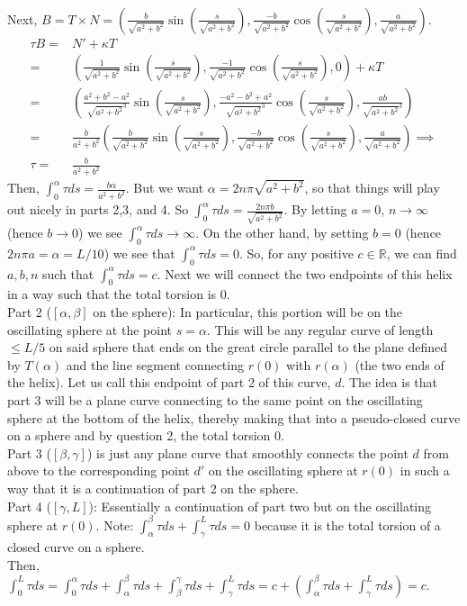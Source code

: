 \documentclass[12pt]{amsart}
\begin{document}
\\Next, $B=T\times N=\left(\frac{b}{\sqrt{a^2+b^2}}\sin\left(\frac{s}{\sqrt{a^2+b^2}}\right),\frac{-b}{\sqrt{a^2+b^2}}\cos\left(\frac{s}{\sqrt{a^2+b^2}}\right),\frac{a}{\sqrt{a^2+b^2}}\right)$.
\begin{align*}
	\tau B=&N'+\kappa T
	\\=&\left(\frac{1}{\sqrt{a^2+b^2}}\sin\left(\frac{s}{\sqrt{a^2+b^2}}\right),\frac{-1}{\sqrt{a^2+b^2}}\cos\left(\frac{s}{\sqrt{a^2+b^2}}\right),0\right)+\kappa T
	\\=&\left(\frac{a^2+b^2-a^2}{\sqrt{a^2+b^2}^3}\sin\left(\frac{s}{\sqrt{a^2+b^2}}\right),\frac{-a^2-b^2+a^2}{\sqrt{a^2+b^2}^3}\cos\left(\frac{s}{\sqrt{a^2+b^2}}\right),\frac{ab}{\sqrt{a^2+b^2}^3}\right)
	\\=&\frac{b}{a^2+b^2}\left(\frac{b}{\sqrt{a^2+b^2}}\sin\left(\frac{s}{\sqrt{a^2+b^2}}\right),\frac{-b}{\sqrt{a^2+b^2}}\cos\left(\frac{s}{\sqrt{a^2+b^2}}\right),\frac{a}{\sqrt{a^2+b^2}}\right)\implies
	\\\tau=&\frac{b}{a^2+b^2}
\end{align*}
Then, $\int_0^\alpha\tau ds=\frac{b\alpha}{a^2+b^2}$. But we want $\alpha=2n\pi\sqrt{a^2+b^2}$, so that things will play out nicely in parts 2,3, and 4. So $\int_0^\alpha\tau ds=\frac{2n\pi b}{\sqrt{a^2+b^2}}$. By letting $a=0$, $n\to \infty$ (hence $b\to0$) we see $\int_0^\alpha\tau ds\to\infty$. On the other hand, by setting $b=0$ (hence $2n\pi a=\alpha=L/10$) we see that $\int_0^\alpha\tau ds=0$. So, for any positive $c\in\mathbb{R}$, we can find $a,b,n$ such that $\int_0^\alpha\tau ds=c$. Next we will connect the two endpoints of this helix in a way such that the total torsion is 0.
\\Part 2 ($[\alpha,\beta]$ on the sphere): In particular, this portion will be on the oscillating sphere at the point $s=\alpha$. This will be any regular curve of length $\leq L/5$ on said sphere that ends on the great circle parallel to the plane defined by $T(\alpha)$ and the line segment connecting $r(0)$ with $r(\alpha)$ (the two ends of the helix). Let us call this endpoint of part 2 of this curve, $d$. The idea is that part 3 will be a plane curve connecting to the same point on the oscillating sphere at the bottom of the helix, thereby making that into a pseudo-closed curve on a sphere and by question 2, the total torsion 0.
\\Part 3 ($[\beta,\gamma]$) is just any plane curve that smoothly connects the point $d$ from above to the corresponding point $d'$ on the oscillating sphere at $r(0)$ in such a way that it is a continuation of part 2 on the sphere.
\\Part 4 ($[\gamma,L]$): Essentially a continuation of part two but on the oscillating sphere at $r(0)$. Note: $\int_\alpha^\beta\tau ds+\int_\gamma^L\tau ds=0$ because it is the total torsion of a closed curve on a sphere.
\\Then, $\int_0^L\tau ds=\int_0^\alpha\tau ds+\int_\alpha^\beta\tau ds+\int_\beta^\gamma\tau ds+\int_\gamma^L\tau ds=c+\left(\int_\alpha^\beta\tau ds+\int_\gamma^L\tau ds\right)=c$.
\end{document}
